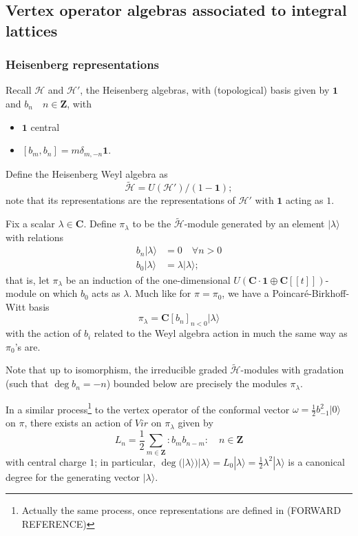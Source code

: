 \documentclass{article}
\newcommand{\CC}{\mathbold{C}}
\newcommand{\ZZ}{\mathbold{Z}}
\newcommand{\vac}{|0\rangle}
\newcommand{\Hh}{\mathcal{H}}
\newcommand{\one}{\mathbold{1}}
\begin{document}
\subsection{Vertex operator algebras associated to integral lattices}

\subsubsection{Heisenberg representations}

Recall $\Hh$ and $\Hh'$, the Heisenberg algebras, with (topological) basis given by $\one$ and $b_n \quad n \in \ZZ$, with
\begin{itemize}
\item $\one$ central
\item $[b_m,b_n]=m\delta_{m,-n}\one$.
\end{itemize}
Define the Heisenberg Weyl algebra as
\[\widetilde{\Hh}=U(\Hh')/(1-\one); \]
note that its representations are the representations of $\Hh'$ with $\one$ acting as $1$.

Fix a scalar $\lambda \in \CC$.  Define $\pi_\lambda$ to be the $\widetilde{\Hh}$-module generated by an element $|\lambda\rangle$ with relations
\begin{align*}
  b_n|\lambda\rangle&=0 \quad \forall n>0\\
  b_0|\lambda\rangle&=\lambda|\lambda\rangle;
\end{align*}
that is, let $\pi_\lambda$ be an induction of the one-dimensional $U(\CC \cdot \one \oplus \CC[[t]])$-module on which $b_0$ acts as $\lambda$.  Much like for $\pi=\pi_0$, we have a Poincaré-Birkhoff-Witt basis
\[\pi_\lambda=\CC[b_n]_{n<0}|\lambda\rangle \]
with the action of $b_i$ related to the Weyl algebra action in much the same way as $\pi_0$'s are.

Note that up to isomorphism, the irreducible graded $\widetilde{\Hh}$-modules with gradation (such that $\deg b_n=-n$) bounded below are precisely the modules $\pi_\lambda$.

In a similar process\footnote{Actually the same process, once representations are defined in (FORWARD REFERENCE)} to the vertex operator of the conformal vector $\omega=\frac{1}{2}b_{-1}^2\vac$ on $\pi$, there exists an action of $Vir$ on $\pi_\lambda$ given by
\[L_n = \frac{1}{2}\sum_{m \in \ZZ}:b_mb_{n-m}: \quad n \in \ZZ \]
with central charge $1$; in particular, $\deg(|\lambda\rangle)|\lambda\rangle=L_0|\lambda\rangle=\frac{1}{2}\lambda^2|\lambda\rangle$ is a canonical degree for the generating vector $|\lambda\rangle$.
\end{document}
